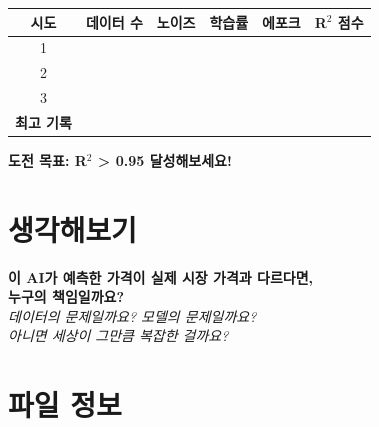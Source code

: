 \documentclass[11pt, a4paper]{article}
\begin{document}
\begin{center}
\begin{tabular}{cccccc}
    \toprule
    \textbf{시도} & \textbf{데이터 수} & \textbf{노이즈} & \textbf{학습률} & \textbf{에포크} & \textbf{R$^2$ 점수} \\
    \midrule
    1 & \hspace{1.5cm} & \hspace{1.2cm} & \hspace{1.2cm} & \hspace{1.2cm} & \hspace{1.5cm} \\[0.5cm]
    2 & & & & & \\[0.5cm]
    3 & & & & & \\[0.5cm]
    \midrule
    \textbf{최고 기록} & & & & & \\[0.3cm]
    \bottomrule
\end{tabular}
\end{center}

\vspace{0.5cm}

\begin{center}
\textbf{도전 목표: R$^2$ > 0.95 달성해보세요!}
\end{center}

\section{생각해보기}

\begin{tcolorbox}[colback=blue!5, colframe=blueprimary, boxrule=1pt]
\begin{center}
\textbf{\large 이 AI가 예측한 가격이 실제 시장 가격과 다르다면,\\[0.3cm]
누구의 책임일까요?}\\[0.5cm]
\textit{데이터의 문제일까요? 모델의 문제일까요?\\
아니면 세상이 그만큼 복잡한 걸까요?}
\end{center}
\end{tcolorbox}

\section{파일 정보}
\end{document}
